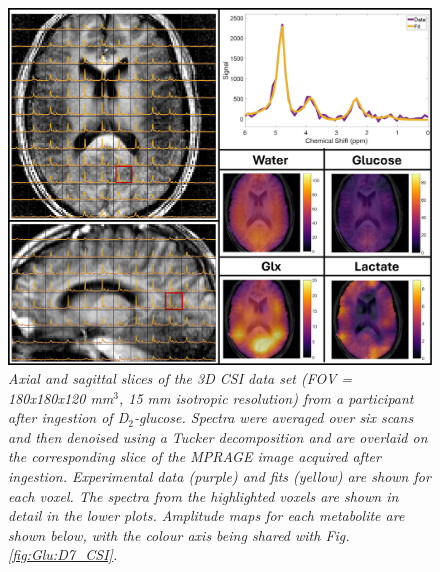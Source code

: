 \begin{figure}
    \centering
    \includegraphics[width = 1\textwidth]{Figures/Glucose/D2_CSI.png}
    \caption{\textit{Axial and sagittal slices of the 3D \ac{CSI} data set (\ac{FOV} = 180x180x120 mm$^3$, 15 mm isotropic resolution) from a participant after ingestion of D$_2$-glucose. Spectra were averaged over six scans and then denoised using a Tucker decomposition and are overlaid on the corresponding slice of the \ac{MPRAGE} image acquired after ingestion. Experimental data (purple) and fits (yellow) are shown for each voxel. The spectra from the highlighted voxels are shown in detail in the lower plots. Amplitude maps for each metabolite are shown below, with the colour axis being shared with Fig. \ref{fig:Glu:D7_CSI}.}}
    \label{fig:Glu:D2_CSI}
\end{figure}

